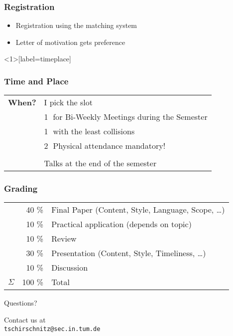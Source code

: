 \documentclass[xcolor={usenames,dvipsnames}]{beamer}
\begin{document}
\begin{frame}
	\frametitle{Registration}
	\begin{itemize}
		\item Registration using the \alert{matching system}
	  	\item Letter of motivation gets preference
	\end{itemize}
\end{frame}

\begin{frame}<1>[label=timeplace]
	\frametitle{Time and Place}
	\begin{center}
		\begin{tabular}{ll}
		        \textbf{When?}  & I pick the slot\\
		        						&\textcircled{1} for Bi-Weekly Meetings during the Semester\\
		        						&\textcircled{1} with the least collisions\\
		        						&\textcircled{2} Physical attendance mandatory!\\
					&\\
					& Talks at the \alert{end} of the semester \\
		\end{tabular}
	\end{center}
\end{frame}


\begin{frame}
\frametitle{Grading}
  \begin{tabular}{lrl}
             & \alert{40 \%}   & Final Paper (Content, Style, Language, Scope, \ldots)\\
	     		 & \alert{10 \%}   & Practical application (depends on topic)  \\
             & \alert{10 \%}   & Review      \\
             & \alert{30 \%}   & Presentation (Content, Style, Timeliness, \ldots) \\
             & \alert{10 \%}   & Discussion                                                   \\
    \midrule
	$\Sigma$ & \alert{100 \%}  & Total                                                        \\
  \end{tabular}
\end{frame}

\begin{frame}
	\begin{center}
		{\huge Questions?}

		\vspace{2cm}

		\begin{center}
			Contact us at \\ \texttt{tschirschnitz@sec.in.tum.de}
		\end{center}

		\vspace{1cm}
	\end{center}
\end{frame}
\end{document}

